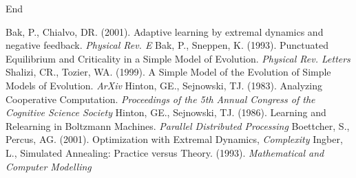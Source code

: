 \documentclass{beamer}
\begin{document}
\begin{frame}
  End
\begin{thebibliography}{99}
    Bak, P., Chialvo, DR. (2001). Adaptive learning by extremal dynamics and negative feedback. \emph{Physical Rev. E}
    Bak, P., Sneppen, K. (1993). Punctuated Equilibrium and Criticality in a Simple Model of Evolution. \emph{Physical Rev. Letters}
    Shalizi, CR., Tozier, WA. (1999). A Simple Model of the Evolution of Simple Models of Evolution. \emph{ArXiv}
    Hinton, GE., Sejnowski, TJ. (1983). Analyzing Cooperative Computation. \emph{Proceedings of the 5th Annual Congress of the Cognitive Science Society}
    Hinton, GE., Sejnowski, TJ. (1986). Learning and Relearning in Boltzmann Machines. \emph{Parallel Distributed Processing}
    Boettcher, S., Percus, AG. (2001). Optimization with Extremal Dynamics, \emph{Complexity}
    Ingber, L., Simulated Annealing: Practice versus Theory. (1993). \emph{Mathematical and Computer Modelling}
\end{thebibliography}

\end{frame}
\end{document}
